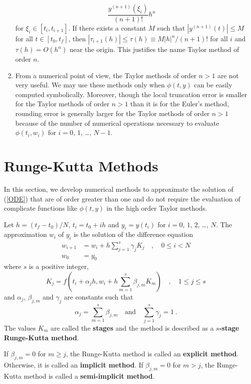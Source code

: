 \begin{rmkList}
\begin{enumerate}
\[\frac{y^{(n+1)}(\xi_i)}{(n+1)!}h^n
\]
for $\xi_i \in [t_i,t_{i+1}]$.  If there exists a constant $M$ such
that $|y^{(n+1)}(t)| \leq M$ for all $t\in [t_0,t_f]$, then
$|\tau_{i+1}(h)| \leq \tau(h) \equiv M|h|^n/(n+1)!$ for all $i$ and
$\tau(h)  = O(h^n)$ near the origin.  This justifies the name Taylor
method of order $n$.
\item From a numerical point of view, the Taylor methods of order
$n>1$ are not very useful.  We may use these methods only when 
$\phi(t,y)$ can be easily computed symbolically.  Moreover, though the
local truncation error is smaller for the Taylor methods of order
$n>1$ than it is for the Euler's method, rounding error is generally
larger for the Taylor methods of order $n>1$ because of the number of
numerical operations necessary to evaluate $\phi(t_i,w_i)$ for $i=0$,
$1$, \ldots, $N-1$.
\end{enumerate}
\end{rmkList}

\section{Runge-Kutta Methods}

In this section, we develop numerical methods to approximate the
solution of (\ref{ODE}) that are of order greater than one and do
not require the evaluation of complicate functions like $\phi(t,y)$ in
the high order Taylor methods.

\begin{defn}
Let $h=(t_f-t_0)/N$, $t_i=t_0+ih$ and $y_i = y(t_i)$ for $i=0$,
$1$, $2$, \ldots, $N$.  The approximation $w_i$ of $y_i$ is the solution of
the difference equation
\begin{align*}
w_{i+1} &= w_i + h \sum_{j=1}^s \gamma_j K_j \quad, \quad 0 \leq i < N \\
w_0 &= y_0
\end{align*}
where $s$ is a positive integer,
\[
K_j = f(t_i + \alpha_j h, w_i + h \sum_{m=1}^s \beta_{j,m} K_m)
\quad, \quad 1 \leq j \leq s
\]
and $\alpha_j$, $\beta_{j,m}$ and $\gamma_j$ are constants such that
\begin{equation}\label{GFRKMcond}
  \alpha_j = \sum_{m=1}^s \beta_{j,m} \quad \text{and} \quad
  \sum_{j=1}^s \gamma_j = 1 \ .
\end{equation}
The values $K_m$ are called the
{\bfseries stages} and the method is
described as a
{\bfseries $s$-stage Runge-Kutta method}.

If $\beta_{j,m} = 0$ for $m\geq j$, the Runge-Kutta method is called
an {\bfseries explicit method}.  Otherwise,
it is called an {\bfseries implicit method}.
If $\beta_{j,m} = 0$ for $m > j$, the Runge-Kutta method is called a
{\bfseries semi-implicit method}.
\label{GFRKM}
\end{defn}

